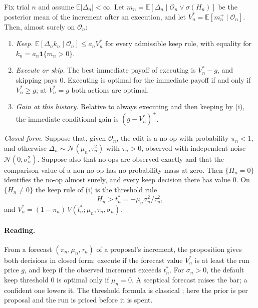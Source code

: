 \begin{proposition}\label{prop:onestep}
Fix trial $n$ and assume $\mathbb{E}|\Delta_n|<\infty$. Let $m_n=\mathbb{E}[\Delta_n\mid\mathcal{O}_n\vee\sigma(H_n)]$ be the posterior mean of the increment after an execution, and let $V^*_n=\mathbb{E}[m_n^+\mid\mathcal{O}_n]$. Then, almost surely on $\mathcal{O}_n$:
\begin{enumerate}
\item[(i)] \emph{Keep.} $\mathbb{E}[\Delta_n k_n\mid\mathcal{O}_n]\le a_nV^*_n$ for every admissible keep rule, with equality for $k_n=a_n\mathbf{1}\{m_n>0\}$.
\item[(ii)] \emph{Execute or skip.} The best immediate payoff of executing is $V^*_n-g$, and skipping pays $0$. Executing is optimal for the immediate payoff if and only if $V^*_n\ge g$; at $V^*_n=g$ both actions are optimal.
\item[(iii)] \emph{Gain at this history.} Relative to always executing and then keeping by (i), the immediate conditional gain is $(g-V^*_n)^+$.
\end{enumerate}
\emph{Closed form.} Suppose that, given $\mathcal{O}_n$, the edit is a no-op with probability $\pi_n<1$, and otherwise $\Delta_n\sim\mathcal{N}(\mu_n,\tau_n^2)$ with $\tau_n>0$, observed with independent noise $\mathcal{N}(0,\sigma_n^2)$. Suppose also that no-ops are observed exactly and that the comparison value of a non-no-op has no probability mass at zero. Then $\{H_n=0\}$ identifies the no-op almost surely, and every keep decision there has value $0$. On $\{H_n\neq0\}$ the keep rule of (i) is the threshold rule
\[
H_n>t^*_n=-\mu_n\sigma_n^2/\tau_n^2 ,
\]
and $V^*_n=(1-\pi_n)\,V(t^*_n;\mu_n,\tau_n,\sigma_n)$.
\end{proposition}

\paragraph{Reading.}
From a forecast $(\pi_n,\mu_n,\tau_n)$ of a proposal's increment, the proposition gives both decisions in closed form: execute if the forecast value $V^*_n$ is at least the run price $g$, and keep if the observed increment exceeds $t^*_n$. For $\sigma_n>0$, the default keep threshold $0$ is optimal only if $\mu_n=0$. A sceptical forecast raises the bar; a confident one lowers it. The threshold formula is classical \citep{xie2013sequential,chick2012sequential}; here the prior is per proposal and the run is priced before it is spent.

